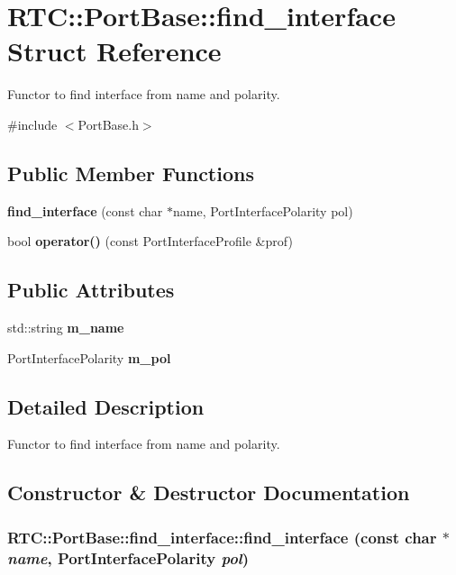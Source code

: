 \section{RTC::PortBase::find\_\-interface Struct Reference}
\label{structRTC_1_1PortBase_1_1find__interface}


Functor to find interface from name and polarity.  




{\ttfamily \#include $<$PortBase.h$>$}

\subsection*{Public Member Functions}
\begin{DoxyCompactItemize}
\item 
{\bf find\_\-interface} (const char $\ast$name, PortInterfacePolarity pol)
\item 
bool {\bf operator()} (const PortInterfaceProfile \&prof)
\end{DoxyCompactItemize}
\subsection*{Public Attributes}
\begin{DoxyCompactItemize}
\item 
std::string {\bf m\_\-name}
\item 
PortInterfacePolarity {\bf m\_\-pol}
\end{DoxyCompactItemize}


\subsection{Detailed Description}
Functor to find interface from name and polarity. 

\subsection{Constructor \& Destructor Documentation}
\subsubsection[{find\_\-interface}]{\setlength{\rightskip}{0pt plus 5cm}RTC::PortBase::find\_\-interface::find\_\-interface (const char $\ast$ {\em name}, \/  PortInterfacePolarity {\em pol})\hspace{0.3cm}{\ttfamily  [inline]}}\label{structRTC_1_1PortBase_1_1find__interface_ace212b36529cbb4723654674caba86d3}


